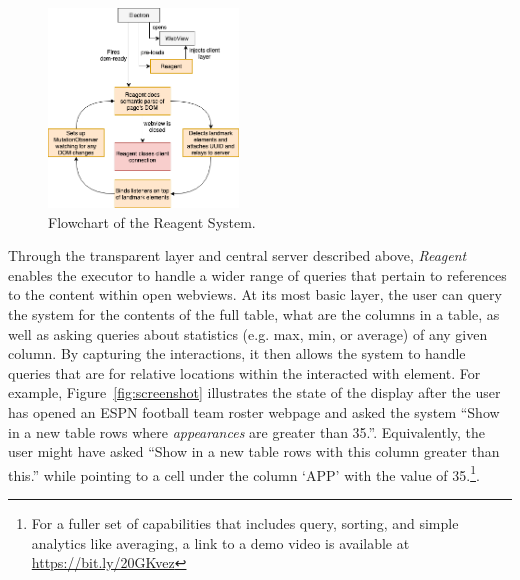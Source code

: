 \begin{figure}
\centering
\includegraphics[width=0.45\textwidth]{figures/reagent.png}
\caption{Flowchart of the Reagent System.}
\label{fig:reagent}
\end{figure}

Through the transparent layer and central server described above, \textit{Reagent} enables
the executor to handle a wider range of queries that pertain to references
to the content within open webviews. At its most basic layer, the user can
query the system for the contents of the full table, what are the columns in a
table, as well as asking queries about statistics (e.g. max, min, or average)
of any given column. By capturing the interactions, it then allows the system
to handle queries that are for relative locations within the interacted with
element. For example, Figure~\ref{fig:screenshot} illustrates the state of the
display after the user has opened an ESPN football team roster webpage and
asked the system ``Show in a new table rows where \textit{appearances} are
greater than 35.''. Equivalently, the user might have asked ``Show in a new
table rows with this column greater than this.'' while pointing to a cell
under the column `APP' with the value of 35.\footnote{For a fuller set of
capabilities that includes query, sorting, and simple analytics like averaging,
a link to a demo video is available at \url{https://bit.ly/20GKvez}}.
